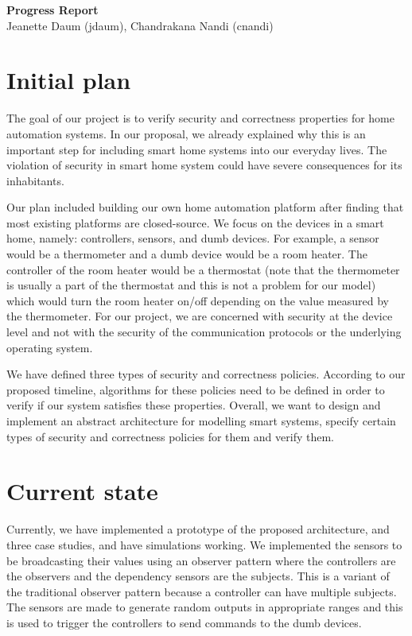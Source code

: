 \documentclass{article}
\begin{document}
\begin{center}
\large \textbf{Progress Report}\\
\normalsize {Jeanette Daum (jdaum), Chandrakana Nandi (cnandi) }
\end{center}
\section{Initial plan}
The goal of our project is to verify security and correctness properties for home automation systems. In our proposal, we already explained why this is an important step for including smart home systems into our everyday lives. The violation of security in smart home system could have severe consequences for its inhabitants. 

Our plan included building our own home automation platform after finding that most existing platforms are closed-source. We focus on the devices in a smart home, namely: controllers, sensors, and dumb devices. For example, a sensor would be a thermometer and a dumb device would be a room heater. The controller of the room heater would be a thermostat (note that the thermometer is usually a part of the thermostat and this is not a problem for our model) which would turn the room heater on/off depending on the value measured by the thermometer. For our project, we are concerned with security at the device level and not with the security of the communication protocols or the underlying operating system. 

We have defined three types of security and correctness policies. According to our proposed timeline, algorithms for these policies need to be defined in order to verify if our system satisfies these properties. Overall, we want to design and implement an abstract architecture for modelling smart systems, specify certain types of security and correctness policies for them and verify them. 

\section{Current state}
Currently, we have implemented a prototype of the proposed architecture, and three case studies, and have simulations working. We implemented the sensors to be broadcasting their values using an observer pattern where the controllers are the observers and the dependency sensors are the subjects. This is a variant of the traditional observer pattern because a controller can have multiple subjects. The sensors are made to generate random outputs in appropriate ranges and this is used to trigger the controllers to send commands to the dumb devices. 
\end{document}
